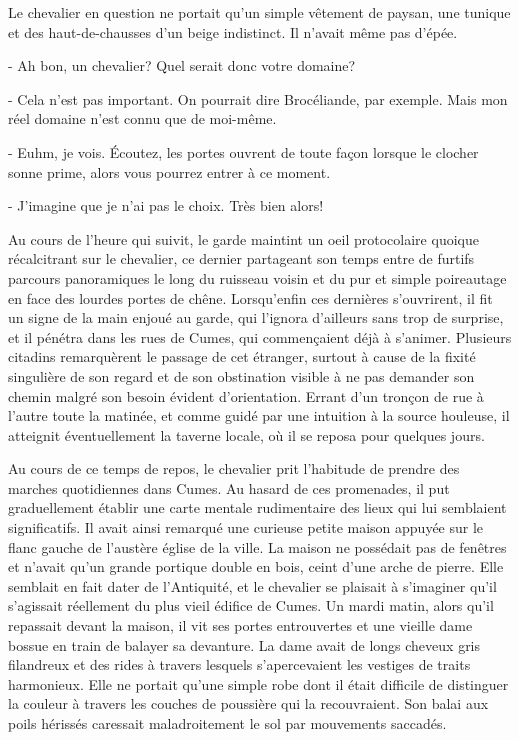 \documentclass[a4paper,11pt, openany]{book}
\begin{document}
Le chevalier en question ne portait qu'un simple vêtement de paysan, une tunique et des haut-de-chausses d'un beige indistinct. Il n'avait même pas d'épée.

- Ah bon, un chevalier? Quel serait donc votre domaine?

- Cela n'est pas important. On pourrait dire Brocéliande, par exemple. Mais mon réel domaine n'est connu que de moi-même.

- Euhm, je vois. Écoutez, les portes ouvrent de toute façon lorsque le clocher sonne prime, alors vous pourrez entrer à ce moment.

- J'imagine que je n'ai pas le choix. Très bien alors!

Au cours de l'heure qui suivit, le garde maintint un oeil protocolaire quoique récalcitrant sur le chevalier, ce dernier partageant son temps entre de furtifs parcours panoramiques le long du ruisseau voisin et du pur et simple poireautage en face des lourdes portes de chêne.
Lorsqu'enfin ces dernières s'ouvrirent, il fit un signe de la main enjoué au garde, qui l'ignora d'ailleurs sans trop de surprise, et il pénétra dans les rues de Cumes, qui commençaient déjà à s'animer.
Plusieurs citadins remarquèrent le passage de cet étranger, surtout à cause de la fixité singulière de son regard et de son obstination visible à ne pas demander son chemin malgré son besoin évident d'orientation.
Errant d'un tronçon de rue à l'autre toute la matinée, et comme guidé par une intuition à la source houleuse, il atteignit éventuellement la taverne locale, où il se reposa pour quelques jours.

Au cours de ce temps de repos, le chevalier prit l'habitude de prendre des marches quotidiennes dans Cumes. Au hasard de ces promenades, il put graduellement établir une carte mentale rudimentaire des lieux qui lui semblaient significatifs. 
Il avait ainsi remarqué une curieuse petite maison appuyée sur le flanc gauche de l'austère église de la ville. La maison ne possédait pas de fenêtres et n'avait qu'un grande portique double en bois, ceint d'une arche de pierre. Elle semblait en fait dater de l'Antiquité,
et le chevalier se plaisait à s'imaginer qu'il s'agissait réellement du plus vieil édifice de Cumes. Un mardi matin, alors qu'il repassait devant la maison, il vit ses portes entrouvertes et une vieille dame bossue en train de balayer sa devanture.
La dame avait de longs cheveux gris filandreux et des rides à travers lesquels s'apercevaient les vestiges de traits harmonieux. Elle ne portait qu'une simple robe dont il était difficile de distinguer la couleur à travers les couches de poussière qui la recouvraient. 
Son balai aux poils hérissés caressait maladroitement le sol par mouvements saccadés.
\end{document}
